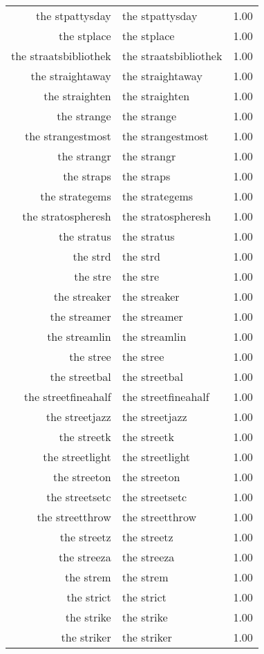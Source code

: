 \begin{table}[ht]
\begin{tabular}{rlr}
  the stpattysday & the stpattysday & 1.00 \\ 
  the stplace & the stplace & 1.00 \\ 
  the straatsbibliothek & the straatsbibliothek & 1.00 \\ 
  the straightaway & the straightaway & 1.00 \\ 
  the straighten & the straighten & 1.00 \\ 
  the strange & the strange & 1.00 \\ 
  the strangestmost & the strangestmost & 1.00 \\ 
  the strangr & the strangr & 1.00 \\ 
  the straps & the straps & 1.00 \\ 
  the strategems & the strategems & 1.00 \\ 
  the stratospheresh & the stratospheresh & 1.00 \\ 
  the stratus & the stratus & 1.00 \\ 
  the strd & the strd & 1.00 \\ 
  the stre & the stre & 1.00 \\ 
  the streaker & the streaker & 1.00 \\ 
  the streamer & the streamer & 1.00 \\ 
  the streamlin & the streamlin & 1.00 \\ 
  the stree & the stree & 1.00 \\ 
  the streetbal & the streetbal & 1.00 \\ 
  the streetfineahalf & the streetfineahalf & 1.00 \\ 
  the streetjazz & the streetjazz & 1.00 \\ 
  the streetk & the streetk & 1.00 \\ 
  the streetlight & the streetlight & 1.00 \\ 
  the streeton & the streeton & 1.00 \\ 
  the streetsetc & the streetsetc & 1.00 \\ 
  the streetthrow & the streetthrow & 1.00 \\ 
  the streetz & the streetz & 1.00 \\ 
  the streeza & the streeza & 1.00 \\ 
  the strem & the strem & 1.00 \\ 
  the strict & the strict & 1.00 \\ 
  the strike & the strike & 1.00 \\ 
  the striker & the striker & 1.00 \\ 

\end{tabular}
\end{table}
